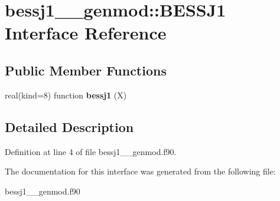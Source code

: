 \hypertarget{interfacebessj1____genmod_1_1_b_e_s_s_j1}{\section{bessj1\+\_\+\+\_\+genmod\+:\+:B\+E\+S\+S\+J1 Interface Reference}
\label{interfacebessj1____genmod_1_1_b_e_s_s_j1}
}
\subsection*{Public Member Functions}
\begin{DoxyCompactItemize}
\item 
\hypertarget{interfacebessj1____genmod_1_1_b_e_s_s_j1_ab6d1aa7e92796484205ec08d31c0a31f}{real(kind=8) function {\bfseries bessj1} (X)}\label{interfacebessj1____genmod_1_1_b_e_s_s_j1_ab6d1aa7e92796484205ec08d31c0a31f}

\end{DoxyCompactItemize}


\subsection{Detailed Description}


Definition at line 4 of file bessj1\+\_\+\+\_\+genmod.\+f90.



The documentation for this interface was generated from the following file\+:\begin{DoxyCompactItemize}
\item 
bessj1\+\_\+\+\_\+genmod.\+f90\end{DoxyCompactItemize}
